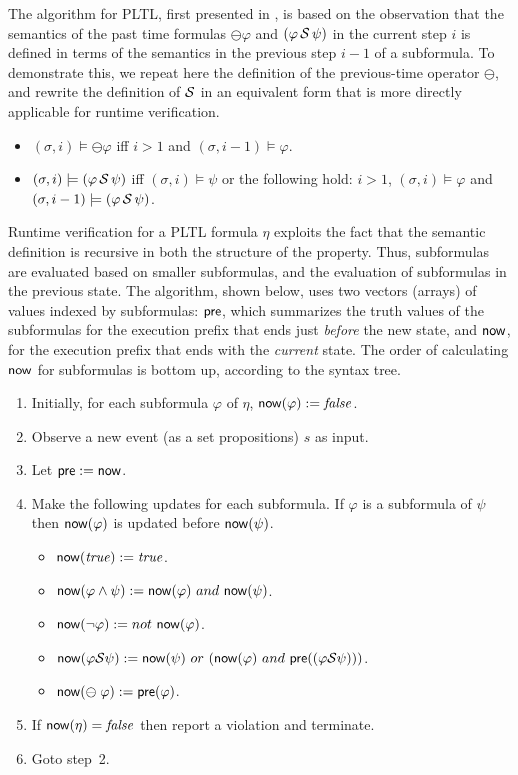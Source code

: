 The algorithm for PLTL, first presented in \cite{HR}, 
is based on the observation that the semantics of the 
past time formulas $\ominus \varphi$ and $(\varphi\, {\cal S} \,\psi)$ in the current step $i$ is defined in terms of the semantics
in the previous step $i - 1$ of a subformula.
To demonstrate this, we repeat here the definition of the previous-time
operator $\ominus$, and rewrite the definition
of ${\cal S}$ in an equivalent form that is
more directly applicable for runtime verification.
\begin{itemize}
\item $( \sigma , i) \models \ominus \varphi$ iff $i > 1$ and $(\sigma, i-1) \models \varphi$.
\item $(\sigma , i) \models (\varphi \, {\cal S} \, \psi)$ iff $(\sigma , i) \models \psi$ or the following hold: $i>1$,
$( \sigma , i)  \models \varphi$ and 
$(\sigma , i-1 ) \models ( \varphi \, {\cal S} \, \psi )$.
\end{itemize}
Runtime verification for a PLTL formula $\eta$ exploits the fact that
the semantic definition is recursive in both the structure of the property. Thus, subformulas
are evaluated based on smaller subformulas, and the
evaluation of subformulas in the previous state.
The algorithm, shown below, uses two vectors (arrays) of values indexed by subformulas:  $\mathsf{pre}$, which summarizes the truth values of the
subformulas for the execution prefix that
ends just {\em before} the new state, and $\mathsf{now}$, for the execution prefix that
ends with the {\em current} state. The order of calculating $\mathsf{now}$ for subformulas is bottom up, according to the syntax tree.
\begin{enumerate}
\item Initially, for each subformula $\varphi$
of $\eta$,
$\mathsf{now} ( \varphi ) := \mathit{false}$.

\item Observe a new event (as a set propositions) $s$ as input. 
\item Let $\mathsf{pre} := \mathsf{now}$.
\item Make the following updates for each subformula. If $\varphi$ is
      a subformula of $\psi$ then $\mathsf{now} ( \varphi )$ is updated before 
      $\mathsf{now} ( \psi )$.
\begin{itemize}
  \item $\mathsf{now} ( \mathit{true} ) := \mathit{true}$.
  \item $\mathsf{now} (  \varphi \wedge \psi  ) := 
  \mathsf{now} ( \varphi )\  and\ \mathsf{now} ( \psi )$.
  \item $\current ( \neg \varphi  ) := not\ \current ( \varphi )$.
  \item $\current (  \varphi \since \psi  ) :=  
  \current ( \psi  )\ or\ ( \current ( \varphi ) \ and\ 
      \old ( ( \varphi \since  \psi )))$.
  \item $\mathsf{now} ( \ominus \; \varphi ) := \mathsf{pre} ( \varphi )$.
\end{itemize}
\item If $\mathsf{now} (\eta) = \mathit{false}$ then
report a violation and terminate.
\item Goto step~2.
\end{enumerate}

